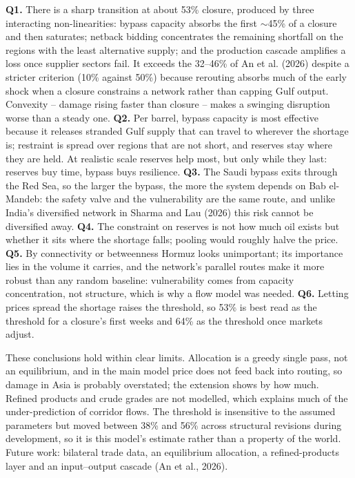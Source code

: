 \documentclass[11pt,a4paper]{article}
\begin{document}
\textbf{Q1.} There is a sharp transition at about 53\% closure, produced by three interacting non-linearities: bypass capacity absorbs the first $\sim$45\% of a closure and then saturates; netback bidding concentrates the remaining shortfall on the regions with the least alternative supply; and the production cascade amplifies a loss once supplier sectors fail. It exceeds the 32--46\% of An et al. (2026) despite a stricter criterion (10\% against 50\%) because rerouting absorbs much of the early shock when a closure constrains a network rather than capping Gulf output. Convexity -- damage rising faster than closure -- makes a swinging disruption worse than a steady one. \textbf{Q2.} Per barrel, bypass capacity is most effective because it releases stranded Gulf supply that can travel to wherever the shortage is; restraint is spread over regions that are not short, and reserves stay where they are held. At realistic scale reserves help most, but only while they last: reserves buy time, bypass buys resilience. \textbf{Q3.} The Saudi bypass exits through the Red Sea, so the larger the bypass, the more the system depends on Bab el-Mandeb: the safety valve and the vulnerability are the same route, and unlike India's diversified network in Sharma and Lau (2026) this risk cannot be diversified away. \textbf{Q4.} The constraint on reserves is not how much oil exists but whether it sits where the shortage falls; pooling would roughly halve the price. \textbf{Q5.} By connectivity or betweenness Hormuz looks unimportant; its importance lies in the volume it carries, and the network's parallel routes make it more robust than any random baseline: vulnerability comes from capacity concentration, not structure, which is why a flow model was needed. \textbf{Q6.} Letting prices spread the shortage raises the threshold, so 53\% is best read as the threshold for a closure's first weeks and 64\% as the threshold once markets adjust.

These conclusions hold within clear limits. Allocation is a greedy single pass, not an equilibrium, and in the main model price does not feed back into routing, so damage in Asia is probably overstated; the extension shows by how much. Refined products and crude grades are not modelled, which explains much of the under-prediction of corridor flows. The threshold is insensitive to the assumed parameters but moved between 38\% and 56\% across structural revisions during development, so it is this model's estimate rather than a property of the world. Future work: bilateral trade data, an equilibrium allocation, a refined-products layer and an input--output cascade (An et al., 2026).
\end{document}
